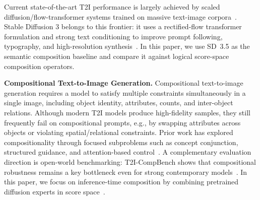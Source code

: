 Current state-of-the-art T2I performance is largely achieved by scaled diffusion/flow-transformer systems trained on massive text-image corpora~\cite{podell2024sdxl,chen2024pixartsigma}. Stable Diffusion 3 belongs to this frontier: it uses a rectified-flow transformer formulation and strong text conditioning to improve prompt following, typography, and high-resolution synthesis~\cite{scaling_rectified_flow_transformers_for_high_resolution_image_synthesis}. In this paper, we use SD~3.5 as the semantic composition baseline and compare it against logical score-space composition operators.

\noindent\textbf{Compositional Text-to-Image Generation.}
Compositional text-to-image generation requires a model to satisfy multiple constraints simultaneously in a single image, including object identity, attributes, counts, and inter-object relations. Although modern T2I models produce high-fidelity samples, they still frequently fail on compositional prompts, e.g., by swapping attributes across objects or violating spatial/relational constraints. Prior work has explored compositionality through focused subproblems such as concept conjunction, structured guidance, and attention-based control~\cite{liu2022compositional,kitada-2022-tfsdg,Wu_2023_ICCV}. A complementary evaluation direction is open-world benchmarking: T2I-CompBench shows that compositional robustness remains a key bottleneck even for strong contemporary models~\cite{NEURIPS2023_f8ad010c}. In this paper, we focus on inference-time composition by combining pretrained diffusion experts in score space~\cite{liu2022compositional}.


